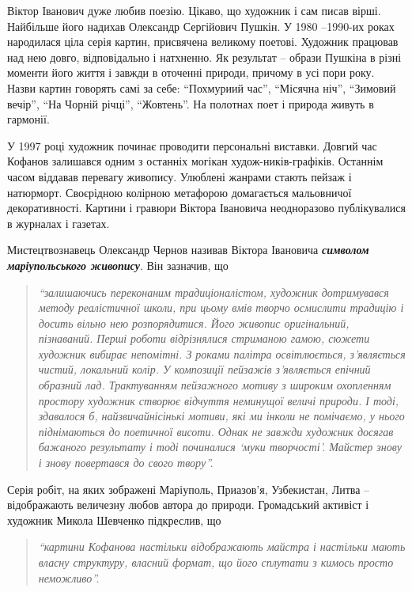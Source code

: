 
Віктор Іванович дуже любив поезію. Цікаво, що художник і сам писав вірші.
Найбільше його надихав Олександр Сергійович Пушкін. У 1980 –1990-их роках
народилася ціла серія картин, присвячена великому поетові. Художник працював
над нею довго, відповідально і натхненно. Як результат – образи Пушкіна в різні
моменти його життя і завжди в оточенні природи, причому в усі пори року. Назви
картин говорять самі за себе: \enquote{Похмуриий час}, \enquote{Місячна ніч}, \enquote{Зимовий вечір},
\enquote{На Чорній річці}, \enquote{Жовтень}. На полотнах поет і природа живуть в гармонії.

У 1997 році художник починає проводити персональні виставки. Довгий час Кофанов
залишався одним з останніх могікан худож\hyp{}ників-графіків. Останнім часом віддавав
перевагу живопису. Улюблені жанрами стають пейзаж і натюрморт. Своєрідною
колірною метафорою домагається мальовничої декоративності. Картини і гравюри
Віктора Івановича неодноразово публікувалися в журналах і газетах.

Мистецтвознавець Олександр Чернов називав Віктора Івановича \emph{\textbf{символом
маріупольського живопису}}. Він зазначив, що 

\begin{quote}
\em\enquote{залишаючись переконаним
традиціоналістом, художник дотримувався методу реалістичної школи, при цьому
вмів творчо осмислити традицію і досить вільно нею розпорядитися. Його живопис
оригінальний, пізнаваний. Перші роботи відрізнялися стриманою гамою, сюжети
художник вибирає непомітні. З роками палітра освітлюється, з'являється чистий,
локальний колір. У композиції пейзажів з'являється епічний образний лад.
Трактуванням пейзажного мотиву з широким охопленням простору художник створює
відчуття неминущої величі природи. І тоді, здавалося б, найзвичайнісінькі
мотиви, які ми інколи не помічаємо, у нього піднімаються до поетичної висоти.
Однак не завжди художник досягав бажаного результату і тоді починалися \enquote{муки
творчості}. Майстер знову і знову повертався до свого твору}.
\end{quote}


Серія робіт, на яких зображені Маріуполь, Приазов'я, Узбекистан, Литва –
відображають величезну любов автора до природи. Громадський активіст і художник
Микола Шевченко підкреслив, що 

\begin{quote}
\em\enquote{картини Кофанова настільки відображають майстра
і настільки мають власну структуру, власний формат, що його сплутати з кимось
просто неможливо}.
\end{quote}

